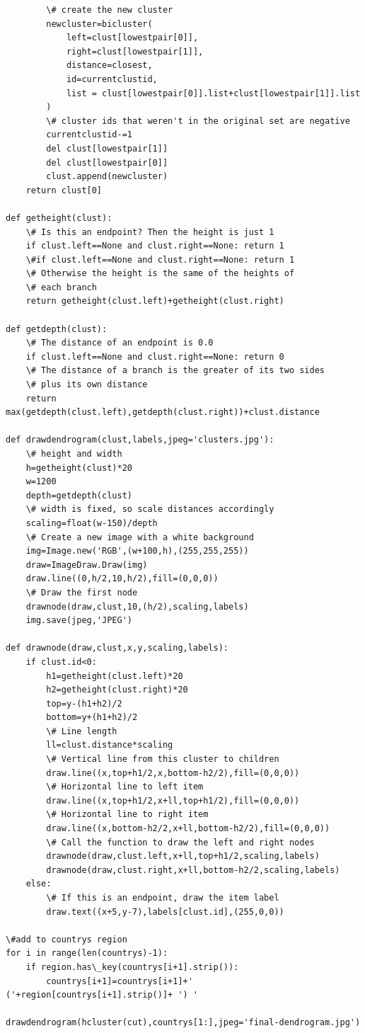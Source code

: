\documentclass[a4paper,11pt]{article}
\begin{document}
\begin{lstlisting}
        \# create the new cluster
        newcluster=bicluster(
            left=clust[lowestpair[0]],
            right=clust[lowestpair[1]],
            distance=closest,
            id=currentclustid,
            list = clust[lowestpair[0]].list+clust[lowestpair[1]].list
        )
        \# cluster ids that weren't in the original set are negative
        currentclustid-=1
        del clust[lowestpair[1]]
        del clust[lowestpair[0]]
        clust.append(newcluster)
    return clust[0]

def getheight(clust):
    \# Is this an endpoint? Then the height is just 1
    if clust.left==None and clust.right==None: return 1
    \#if clust.left==None and clust.right==None: return 1
    \# Otherwise the height is the same of the heights of
    \# each branch
    return getheight(clust.left)+getheight(clust.right)

def getdepth(clust):
    \# The distance of an endpoint is 0.0
    if clust.left==None and clust.right==None: return 0
    \# The distance of a branch is the greater of its two sides
    \# plus its own distance
    return max(getdepth(clust.left),getdepth(clust.right))+clust.distance

def drawdendrogram(clust,labels,jpeg='clusters.jpg'):
    \# height and width
    h=getheight(clust)*20
    w=1200
    depth=getdepth(clust)
    \# width is fixed, so scale distances accordingly
    scaling=float(w-150)/depth
    \# Create a new image with a white background
    img=Image.new('RGB',(w+100,h),(255,255,255))
    draw=ImageDraw.Draw(img)
    draw.line((0,h/2,10,h/2),fill=(0,0,0))
    \# Draw the first node
    drawnode(draw,clust,10,(h/2),scaling,labels)
    img.save(jpeg,'JPEG')

def drawnode(draw,clust,x,y,scaling,labels):
    if clust.id<0:
        h1=getheight(clust.left)*20
        h2=getheight(clust.right)*20
        top=y-(h1+h2)/2
        bottom=y+(h1+h2)/2
        \# Line length
        ll=clust.distance*scaling
        \# Vertical line from this cluster to children
        draw.line((x,top+h1/2,x,bottom-h2/2),fill=(0,0,0))
        \# Horizontal line to left item
        draw.line((x,top+h1/2,x+ll,top+h1/2),fill=(0,0,0))
        \# Horizontal line to right item
        draw.line((x,bottom-h2/2,x+ll,bottom-h2/2),fill=(0,0,0))
        \# Call the function to draw the left and right nodes
        drawnode(draw,clust.left,x+ll,top+h1/2,scaling,labels)
        drawnode(draw,clust.right,x+ll,bottom-h2/2,scaling,labels)
    else:
        \# If this is an endpoint, draw the item label
        draw.text((x+5,y-7),labels[clust.id],(255,0,0))

\#add to countrys region
for i in range(len(countrys)-1):
    if region.has\_key(countrys[i+1].strip()):
        countrys[i+1]=countrys[i+1]+' ('+region[countrys[i+1].strip()]+ ') '

drawdendrogram(hcluster(cut),countrys[1:],jpeg='final-dendrogram.jpg')
\end{lstlisting}
\end{document}
